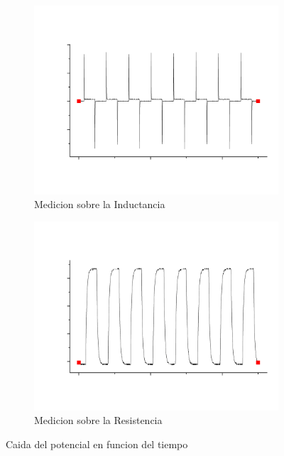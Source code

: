 \documentclass[11pt,a4paper]{article}
\begin{document}
\begin{figure}[H]

\begin{subfigure}{0.5\textwidth}
\includegraphics[scale=0.30]{RL-Caida_en_Inductancia}
  \caption{Medicion sobre la Inductancia}
  \label{subfig:RL_CI}
\end{subfigure}
\begin{subfigure}{0.5\textwidth}
\includegraphics[scale=0.30]{RL-Caida_en_Resistencia}
  \caption{Medicion sobre la Resistencia}
  \label{subfig:RL_CR}
\end{subfigure}

 \label{fig:RL_C}
  \caption{Caida del potencial en funcion del tiempo}
\end{figure}
\end{document}
